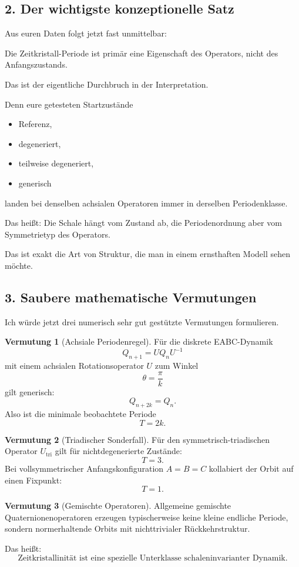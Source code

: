 \documentclass[11pt,a4paper]{article}
\theoremstyle{definition}
\newtheorem{vermutung}{Vermutung}
\begin{document}
	\subsection*{2. Der wichtigste konzeptionelle Satz}
	
	Aus euren Daten folgt jetzt fast unmittelbar:
	
	Die Zeitkristall-Periode ist primär eine Eigenschaft des Operators, nicht des Anfangszustands.
	
	Das ist der eigentliche Durchbruch in der Interpretation.
	
	Denn eure getesteten Startzustände
	\begin{itemize}
		\item Referenz,
		\item degeneriert,
		\item teilweise degeneriert,
		\item generisch
	\end{itemize}
	landen bei denselben achsialen Operatoren immer in derselben Periodenklasse.
	
	Das heißt: Die Schale hängt vom Zustand ab, die Periodenordnung aber vom Symmetrietyp des Operators.
	
	Das ist exakt die Art von Struktur, die man in einem ernsthaften Modell sehen möchte.
	
	\subsection*{3. Saubere mathematische Vermutungen}
	
	Ich würde jetzt drei numerisch sehr gut gestützte Vermutungen formulieren.
	
	\begin{vermutung}[Achsiale Periodenregel]
		Für die diskrete EABC-Dynamik
		\[
		Q_{n+1}=UQ_nU^{-1}
		\]
		mit einem achsialen Rotationsoperator $U$ zum Winkel
		\[
		\theta=\frac{\pi}{k}
		\]
		gilt generisch:
		\[
		Q_{n+2k}=Q_n.
		\]
		Also ist die minimale beobachtete Periode
		\[
		T=2k.
		\]
	\end{vermutung}
	
	\begin{vermutung}[Triadischer Sonderfall]
		Für den symmetrisch-triadischen Operator $U_{\mathrm{tri}}$ gilt für nichtdegenerierte Zustände:
		\[
		T=3.
		\]
		Bei vollsymmetrischer Anfangskonfiguration $A=B=C$ kollabiert der Orbit auf einen Fixpunkt:
		\[
		T=1.
		\]
	\end{vermutung}
	
	\begin{vermutung}[Gemischte Operatoren]
		Allgemeine gemischte Quaternionenoperatoren erzeugen typischerweise keine kleine endliche Periode, sondern normerhaltende Orbits mit nichttrivialer Rückkehrstruktur.
		
		Das heißt:
		\[
		\text{Zeitkristallinität ist eine spezielle Unterklasse schaleninvarianter Dynamik.}
		\]
	\end{vermutung}
	
\end{document}
